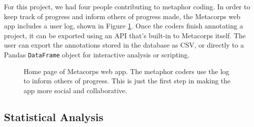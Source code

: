 For this project, we had four people contributing to metaphor coding. In order
to keep track of progress and inform others of progress made, the Metacorps
web app includes a user log, shown in Figure \ref{fig:metacorps-home}. 
Once the coders finish annotating a project, it can be exported using an API
that's built-in to Metacorps itself. The user can export the annotations stored
in the database as CSV, or directly to a Pandas \texttt{DataFrame} object
\cite{McKinney2013} for interactive analysis or scripting.

\begin{figure}
    \centering
\caption{Home page of Metacorps web app. The metaphor coders use the log to
    inform others of progress. This is just the first step in making the
    app more social and collaborative.}
\label{fig:metacorps-home}
\end{figure}


\subsection{Statistical Analysis}
\label{sub:statistical-analysis}

